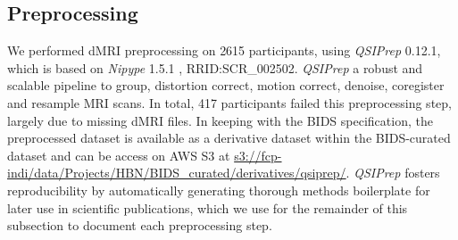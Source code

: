 \documentclass[9pt,lineno]{elife}
\begin{document}
\subsection{Preprocessing}

We performed dMRI preprocessing on \num{2615} participants, using \emph{QSIPrep}
\citep{cieslak2021-iq} 0.12.1, which is based on \emph{Nipype} 1.5.1
\citep{nipype1,nipype2}, RRID:SCR\_002502. \emph{QSIPrep} a robust and scalable
pipeline to group, distortion correct, motion correct, denoise, coregister and
resample MRI scans. In total, \num{417} participants failed this preprocessing
step, largely due to missing dMRI files. 
In keeping with the BIDS specification,
the preprocessed dataset is available as a derivative dataset within the
BIDS-curated dataset and can be access on AWS S3 at
\url{s3://fcp-indi/data/Projects/HBN/BIDS_curated/derivatives/qsiprep/}.
\emph{QSIPrep} fosters reproducibility by automatically generating thorough
methods boilerplate for later use in scientific publications, which we use for
the remainder of this subsection to document each preprocessing step.
\end{document}
